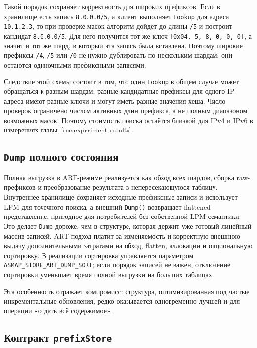 Такой порядок сохраняет корректность для широких префиксов. Если в
хранилище есть запись \texttt{8.0.0.0/5}, а клиент выполняет
\texttt{Lookup} для адреса \texttt{10.1.2.3}, то при проверке масок
алгоритм дойдёт до длины \texttt{/5} и построит кандидат
\texttt{8.0.0.0/5}. Для него получится тот же ключ
\texttt{[0x04, 5, 8, 0, 0, 0]}, а значит и тот же шард, в который эта
запись была вставлена. Поэтому широкие префиксы \texttt{/4},
\texttt{/5} или \texttt{/0} не нужно дублировать по нескольким шардам:
они остаются одиночными префиксными записями.

Следствие этой схемы состоит в том, что один \texttt{Lookup} в общем
случае может обращаться к разным шардам: разные кандидатные префиксы для
одного IP-адреса имеют разные ключи и могут иметь разные значения хеша.
Число проверок ограничено числом активных длин префикса, а не полным
диапазоном возможных масок. Поэтому стоимость поиска остаётся близкой для
IPv4 и IPv6 в измерениях главы~\ref{sec:experiment-results}.

\subsection{\texttt{Dump} полного состояния}

Полная выгрузка в ART-режиме реализуется как обход всех шардов, сборка
raw-префиксов и преобразование результата в непересекающуюся таблицу.
Внутреннее хранилище сохраняет исходные префиксные записи и использует LPM
для точечного поиска, а внешний \texttt{Dump()} возвращает flattened
представление, пригодное для потребителей без собственной LPM-семантики.
Это делает \texttt{Dump} дороже, чем в структуре, которая держит уже
готовый линейный массив записей. ART-подход платит за изменяемость и
корректную внешнюю выдачу дополнительными затратами на обход, flatten,
аллокации и опциональную сортировку. В реализации сортировка управляется
параметром \texttt{ASMAP\_STORE\_ART\_DUMP\_SORT}; если порядок записей не
важен, отключение сортировки уменьшает время полной выгрузки на больших
таблицах.

Эта особенность отражает компромисс: структура, оптимизированная под
частые инкрементальные обновления, редко оказывается одновременно лучшей
и для операции «отдать всё содержимое».

\subsection{Контракт \texttt{prefixStore}}

